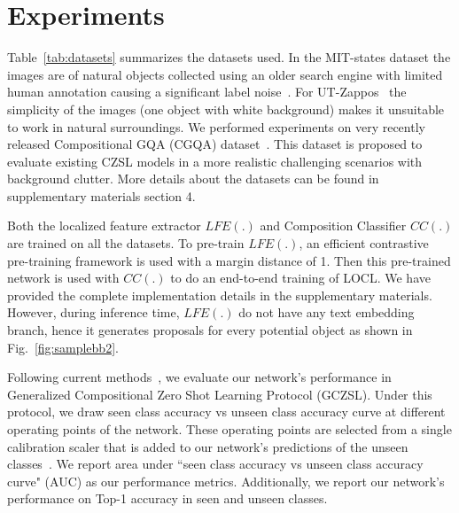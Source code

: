 \documentclass{bmvc2k}
\begin{document}
%
 \vspace{-0.4cm}







\section{Experiments}\label{section:implementation}
\vspace{-0.15cm}
Table~\ref{tab:datasets} summarizes the datasets used. In the MIT-states dataset the images are of natural objects collected using an older search engine with limited human annotation causing a significant label noise~\cite{Atzmon_casual}. For UT-Zappos~\cite{yu2017semantic} the simplicity of the images (one object with white background) makes it unsuitable to work in natural surroundings. We performed experiments on very recently released Compositional GQA (CGQA) dataset~\cite{mancini2021learning,hudson2019gqa}. This dataset is proposed to evaluate existing CZSL models in a more realistic challenging scenarios with background clutter. More details about the datasets can be found in supplementary materials section 4. 

Both the localized feature extractor $LFE(.)$ and Composition Classifier $CC(.)$ are trained on all the datasets. To pre-train $LFE(.)$, an efficient contrastive pre-training framework is used with a margin distance of 1. Then this pre-trained network is used with $CC(.)$ to do an end-to-end training of LOCL. We have provided the complete implementation details in the supplementary materials. However, during inference time, $LFE(.)$ do not have any text embedding branch, hence it generates proposals for every potential object as shown in Fig.~\ref{fig:samplebb2}. 

Following current methods~\cite{purushwalkam2019task,li2020symmetry,naeem2021learning}, we evaluate our network's performance in Generalized Compositional Zero Shot Learning Protocol (GCZSL). Under this protocol, we draw seen class accuracy vs unseen class accuracy curve at different operating points of the network. These operating points are selected from a single calibration scaler that is added to our network's predictions of the unseen classes~\cite{purushwalkam2019task, li2020symmetry, naeem2021learning}.   
We report area under ``seen class accuracy vs unseen class accuracy curve" (AUC) as our performance metrics. Additionally, we report our network's performance on Top-1 accuracy in seen and unseen classes.
\end{document}
